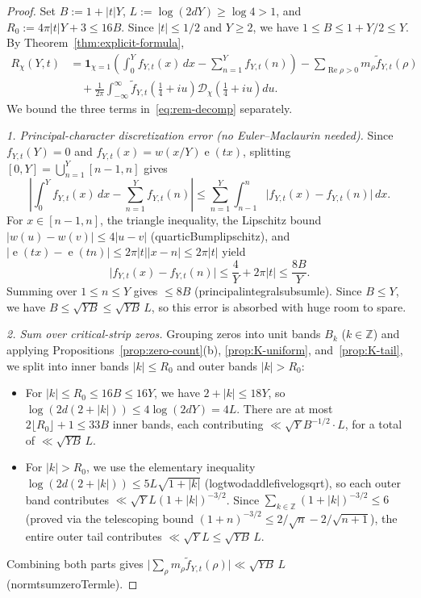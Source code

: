 \documentclass[11pt,reqno]{amsart}
\numberwithin{equation}{section}
\theoremstyle{definition}
\newcommand{\Z}{\mathbb{Z}}
\newcommand{\1}{\mathbf{1}}
\newcommand{\e}{\operatorname{e}}
\newcommand{\D}{\mathcal{D}}
\renewcommand{\Re}{\operatorname{Re}}
\newcommand{\lean}[1]{{\footnotesize\ttfamily\renewcommand{\_}{\textunderscore\allowbreak}#1}}
\begin{document}
\begin{proof}
Set $B := 1 + |t|Y$, $L := \log(2dY) \ge \log 4 > 1$, and $R_0 := 4\pi|t|Y + 3 \le 16 B$. Since $|t| \le 1/2$ and $Y \ge 2$, we have $1 \le B \le 1 + Y/2 \le Y$. By Theorem~\ref{thm:explicit-formula},
\begin{align}
  R_\chi(Y, t)
  &= \1_{\chi=1}\!\left(\int_0^Y f_{Y,t}(x)\,dx - \sum_{n=1}^Y f_{Y,t}(n)\right)
     - \sum_{\Re \rho > 0} m_\rho \widetilde{f}_{Y,t}(\rho) \nonumber\\
  &\quad + \frac{1}{2\pi}\int_{-\infty}^\infty \widetilde{f}_{Y,t}\!\left(\tfrac{1}{4}+iu\right) \D_\chi\!\left(\tfrac{1}{4}+iu\right) du.
  \label{eq:rem-decomp}
\end{align}
We bound the three terms in~\eqref{eq:rem-decomp} separately.

\emph{1. Principal-character discretization error (no Euler--Maclaurin needed).}
Since $f_{Y,t}(Y) = 0$ and $f_{Y,t}(x) = w(x/Y)\e(tx)$, splitting $[0, Y] = \bigcup_{n=1}^Y [n-1, n]$ gives
\[
  \left|\int_0^Y f_{Y,t}(x)\,dx - \sum_{n=1}^Y f_{Y,t}(n)\right|
  \le \sum_{n=1}^Y \int_{n-1}^n \bigl|f_{Y,t}(x) - f_{Y,t}(n)\bigr|\,dx.
\]
For $x \in [n-1, n]$, the triangle inequality, the Lipschitz bound $|w(u) - w(v)| \le 4|u - v|$ (\lean{quarticBump\_lipschitz}), and $|\e(tx) - \e(tn)| \le 2\pi|t||x-n| \le 2\pi|t|$ yield
\[
  \bigl|f_{Y,t}(x) - f_{Y,t}(n)\bigr| \le \frac{4}{Y} + 2\pi|t| \le \frac{8 B}{Y}.
\]
Summing over $1 \le n \le Y$ gives $\le 8 B$ (\lean{principal\_integral\_sub\_sum\_le}). Since $B \le Y$, we have $B \le \sqrt{YB} \le \sqrt{YB}\,L$, so this error is absorbed with huge room to spare.

\emph{2. Sum over critical-strip zeros.}
Grouping zeros into unit bands $B_k$ ($k \in \Z$) and applying Propositions~\ref{prop:zero-count}(b), \ref{prop:K-uniform}, and~\ref{prop:K-tail}, we split into inner bands $|k| \le R_0$ and outer bands $|k| > R_0$:
\begin{itemize}
  \item For $|k| \le R_0 \le 16 B \le 16 Y$, we have $2 + |k| \le 18 Y$, so $\log(2d(2+|k|)) \le 4 \log(2dY) = 4L$. There are at most $2\lfloor R_0 \rfloor + 1 \le 33 B$ inner bands, each contributing $\ll \sqrt{Y} B^{-1/2} \cdot L$, for a total of $\ll \sqrt{Y B}\, L$.
  \item For $|k| > R_0$, we use the elementary inequality $\log(2d(2+|k|)) \le 5 L \sqrt{1 + |k|}$ (\lean{log\_two\_d\_add\_le\_five\_log\_sqrt}), so each outer band contributes $\ll \sqrt{Y} L (1 + |k|)^{-3/2}$. Since $\sum_{k \in \Z} (1+|k|)^{-3/2} \le 6$ (proved via the telescoping bound $(1+n)^{-3/2} \le 2/\sqrt{n} - 2/\sqrt{n+1}$), the entire outer tail contributes $\ll \sqrt{Y} L \le \sqrt{Y B}\, L$.
\end{itemize}
Combining both parts gives $\bigl|\sum_{\rho} m_\rho \widetilde{f}_{Y,t}(\rho)\bigr| \ll \sqrt{YB}\, L$ (\lean{norm\_tsum\_zeroTerm\_le}).


\end{proof}
\end{document}
